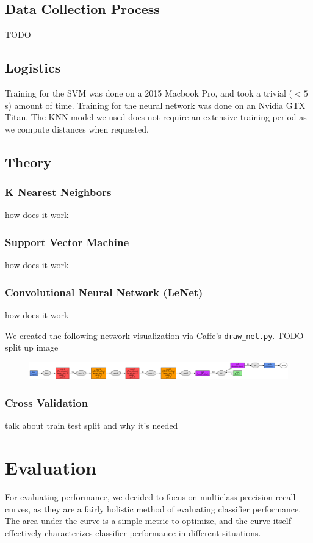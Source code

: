 \documentclass[leqno]{article}
\begin{document}
\subsection{Data Collection Process}
TODO

\subsection{Logistics}
Training for the SVM was done on a 2015 Macbook Pro, and took a trivial ($<5$s)
amount of time.
Training for the neural network was done on an Nvidia GTX Titan.
The KNN model we used does not require an extensive training period as we
compute distances when requested.

\subsection{Theory}
\subsubsection{K Nearest Neighbors}
how does it work
\subsubsection{Support Vector Machine}
how does it work
\subsubsection{Convolutional Neural Network (LeNet)}
how does it work

We created the following network visualization via Caffe's
\texttt{draw\_net.py}.
 TODO split up image
\begin{figure}[h!]
  \centering
  \includegraphics[width=\textwidth]{lenet.png}
\end{figure}
\subsubsection{Cross Validation}
talk about train test split and why it's needed
\section{Evaluation}
For evaluating performance, we decided to focus on multiclass precision-recall
curves, as they are a fairly holistic method of evaluating classifier
performance. The area under the curve is a simple metric to optimize, and the
curve itself effectively characterizes classifier performance in different
situations.
\end{document}
